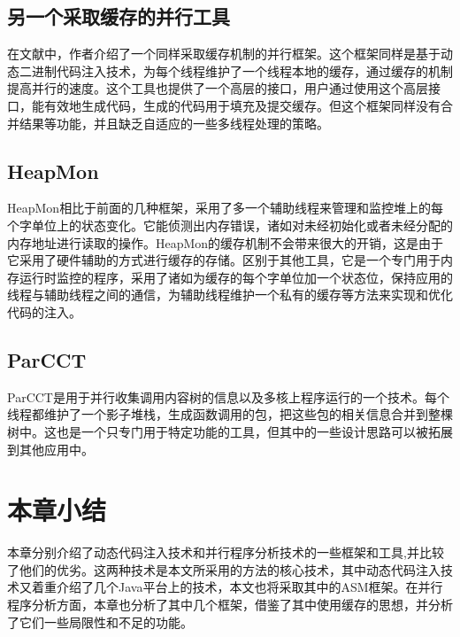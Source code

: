 \subsection{另一个采取缓存的并行工具}

在文献\cite{paSpeed}中，作者介绍了一个同样采取缓存机制的并行框架。这个框架同样是基于动态二进制代码注入技术，为每个线程维护了一个线程本地的缓存，通过缓存的机制提高并行的速度。这个工具也提供了一个高层的接口，用户通过使用这个高层接口，能有效地生成代码，生成的代码用于填充及提交缓存。但这个框架同样没有合并结果等功能，并且缺乏自适应的一些多线程处理的策略。

\subsection{HeapMon}

HeapMon\cite{heapmon}相比于前面的几种框架，采用了多一个辅助线程来管理和监控堆上的每个字单位上的状态变化。它能侦测出内存错误，诸如对未经初始化或者未经分配的内存地址进行读取的操作。HeapMon的缓存机制不会带来很大的开销，这是由于它采用了硬件辅助的方式进行缓存的存储。区别于其他工具，它是一个专门用于内存运行时监控的程序，采用了诸如为缓存的每个字单位加一个状态位，保持应用的线程与辅助线程之间的通信，为辅助线程维护一个私有的缓存等方法来实现和优化代码的注入。

\subsection{ParCCT}

ParCCT\cite{parcct1, parcct2}是用于并行收集调用内容树的信息以及多核上程序运行的一个技术。每个线程都维护了一个影子堆栈，生成函数调用的包，把这些包的相关信息合并到整棵树中。这也是一个只专门用于特定功能的工具，但其中的一些设计思路可以被拓展到其他应用中。

\section{本章小结}

本章分别介绍了动态代码注入技术和并行程序分析技术的一些框架和工具,并比较了他们的优劣。这两种技术是本文所采用的方法的核心技术，其中动态代码注入技术又着重介绍了几个Java平台上的技术，本文也将采取其中的ASM框架。在并行程序分析方面，本章也分析了其中几个框架，借鉴了其中使用缓存的思想，并分析了它们一些局限性和不足的功能。
